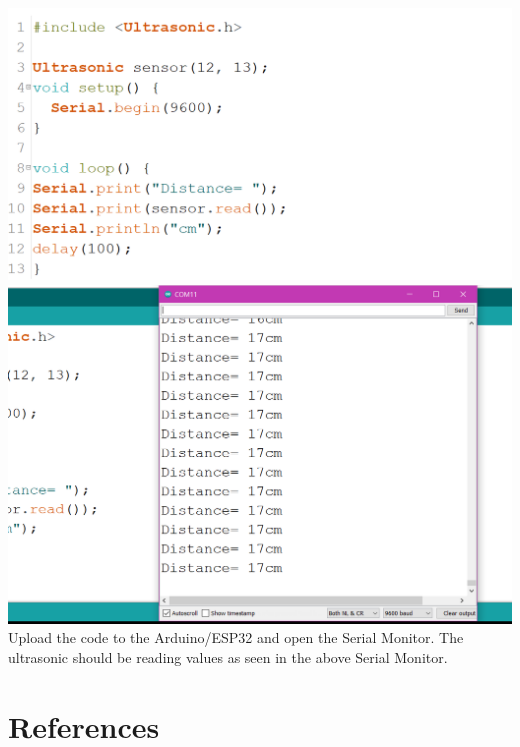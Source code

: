 \documentclass[a4paper,12pt]{report}
\newcommand{\diagramWidth}{150mm}
\begin{document}
    \newpage
    \includegraphics[width = \diagramWidth]{Assets/ultrasonic_code.png} \\
    \includegraphics[width = \diagramWidth]{Assets/ultrasonic_monitor.png} \\
    Upload the code to the Arduino/ESP32 and open the Serial Monitor. The ultrasonic should be reading values as seen in the above Serial Monitor.
    
\newpage
\section*{References}


\end{document}
